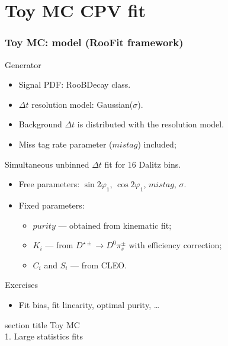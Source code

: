 \documentclass[10 pt,compress,mathserif]{beamer}
\begin{document}
\section{Toy MC CPV fit}
\frame{\tableofcontents[current]}
\begin{frame}
 \frametitle{Toy MC: model (RooFit framework)}
 
 \begin{block}{Generator}
 \begin{itemize}
  \item Signal PDF: RooBDecay class.
  \item $\Delta t$ resolution model: Gaussian($\sigma$).
  \item Background $\Delta t$ is distributed with the resolution model.
  \item Miss tag rate parameter ($mistag$) included;
 \end{itemize}
 \end{block}
 
 \begin{block}{Simultaneous unbinned $\Delta t$ fit for $16$ Dalitz bins.}
 \begin{itemize}
  \item Free parameters: $\sin{2\varphi_1}$, $\cos{2\varphi_1}$, $mistag$, $\sigma$.
  \item Fixed parameters:
   \begin{itemize}
    \item $purity$ --- obtained from kinematic fit;
    \item $K_i$ --- from $D^{\star\pm}\to D^0\pi^{\pm}_s$ with efficiency correction;
    \item $C_i$ and $S_i$ --- from CLEO.
   \end{itemize}
  \end{itemize}
 \end{block}

 \begin{block}{Exercises}
  \begin{itemize}
   \item Fit bias, fit linearity, optimal purity, \dots
  \end{itemize}
 \end{block}
\end{frame}

\begin{frame}
 \centering
    \begin{beamercolorbox}[sep=8pt,center]{section title}
       Toy MC\\ 1. Large statistics fits
    \end{beamercolorbox}
\end{frame}
\end{document}
